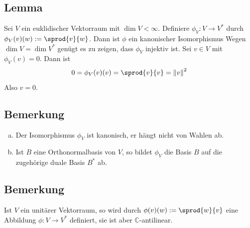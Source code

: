 \subsection[Lemma: Kanonischer Isomorphismus zwischen euklidischem Vektorraum und seinem Dualraum]{Lemma} %
\label{sub:1210}
Sei $V$ ein euklidischer Vektorraum mit $\dim V < \infty$. Definiere $\phi_V : V \to V^*$ durch $\phi_V (v)(w) := \sprod{v}{w} $. Dann ist $\phi$ ein kanonischer 
Isomorphismus
Wegen $\dim V = \dim V^*$ genügt es zu zeigen, dass $\phi_V$ injektiv ist. Sei $v \in V$ mit $\phi_V (v)=0 $. Dann ist 
\[
	0= \phi_V (v)(v) = \sprod{v}{v} =\norm{v}^2   
\]
Also $v=0$. \bewende 

\subsection[Bemerkung: Abbildung einer Orthonormalbasis]{Bemerkung} %
\label{sub:1211}
\begin{enumerate}[a)]
	\item Der Isomorphismus $\phi_V$ ist kanonisch, er hängt nicht von Wahlen ab.
	\item Ist $B$ eine Orthonormalbasis von $V$, so bildet $\phi_V$ die Basis $B$ auf die zugehörige duale Basis $B^*$ ab.
\end{enumerate}

\subsection[Bemerkung: In unitären Vektorräumen existiert dieser Isomorphismus nicht]{Bemerkung} %
\label{sub:1212}
Ist $V$ ein unitärer Vektorraum, so wird durch $\phi(v) (w) := \sprod{w}{v} $ eine Abbildung $\phi : V \to V^*$ definiert, sie ist aber $\mathds{C}$-antilinear.

